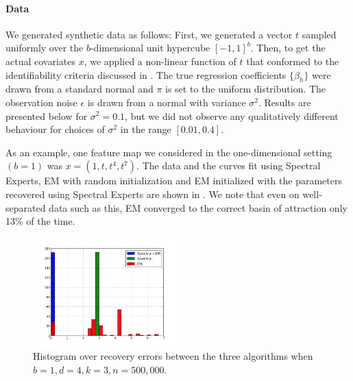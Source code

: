 \paragraph{Data}

We generated synthetic data as follows:
First, we generated a vector $t$ sampled uniformly over the $b$-dimensional
unit hypercube $[-1,1]^b$.
Then, to get the actual covariates $x$, we applied a non-linear function of $t$
that conformed to the identifiability criteria discussed in
.
The true regression coefficients $\{\beta_h\}$ were drawn from a standard normal
and $\pi$ is set to the uniform distribution.
The observation noise $\epsilon$ is drawn from a normal with variance $\sigma^2$.
Results are presented below for $\sigma^2 = 0.1$, but we did not observe any
qualitatively different behaviour for choices of $\sigma^2$ in the range
$[0.01, 0.4]$.  

As an example, one feature map we considered in the one-dimensional
setting $(b=1)$ was $x = (1, t, t^4, t^7)$. The data and the curves fit using
Spectral Experts, EM with random initialization and EM initialized with
the parameters recovered using Spectral Experts are shown in
. We note that even on well-separated data such as
this, EM converged to the correct basin of attraction only 13\% of the time.

\begin{figure}[t]
  \centering
  \includegraphics[width=0.50\textwidth]{figures/hist.png}
  \caption{Histogram over recovery errors between the three algorithms when $b = 1, d = 4, k = 3, n = 500,000$.}
  \label{fig:hist}
\end{figure}


